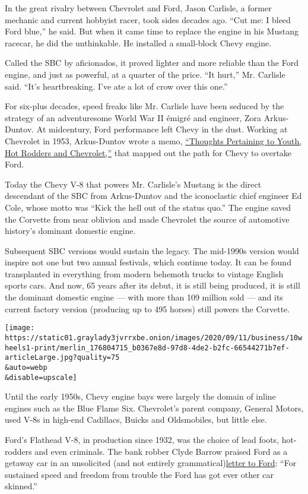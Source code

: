 In the great rivalry between Chevrolet and Ford, Jason Carlisle, a
former mechanic and current hobbyist racer, took sides decades ago.
``Cut me: I bleed Ford blue,'' he said. But when it came time to replace
the engine in his Mustang racecar, he did the unthinkable. He installed
a small-block Chevy engine.

Called the SBC by aficionados, it proved lighter and more reliable than
the Ford engine, and just as powerful, at a quarter of the price. ``It
hurt,'' Mr. Carlisle said. ``It's heartbreaking. I've ate a lot of crow
over this one.''

For six-plus decades, speed freaks like Mr. Carlisle have been seduced
by the strategy of an adventuresome World War II émigré and engineer,
Zora Arkus-Duntov. At midcentury, Ford performance left Chevy in the
dust. Working at Chevrolet in 1953, Arkus-Duntov wrote a memo,
\href{https://www.corvetteactioncenter.com/history/duntov_letter.html}{``Thoughts
Pertaining to Youth, Hot Rodders and Chevrolet,''} that mapped out the
path for Chevy to overtake Ford.

Today the Chevy V-8 that powers Mr. Carlisle's Mustang is the direct
descendant of the SBC from Arkus-Duntov and the iconoclastic chief
engineer Ed Cole, whose motto was ``Kick the hell out of the status
quo.'' The engine saved the Corvette from near oblivion and made
Chevrolet the source of automotive history's dominant domestic engine.

Subsequent SBC versions would sustain the legacy. The mid-1990s version
would inspire not one but two annual festivals, which continue today. It
can be found transplanted in everything from modern behemoth trucks to
vintage English sports cars. And now, 65 years after its debut, it is
still being produced, it is still the dominant domestic engine --- with
more than 109 million sold --- and its current factory version
(producing up to 495 horses) still powers the Corvette.

\texttt{[image: https://static01.graylady3jvrrxbe.onion/images/2020/09/11/business/10wheels1-print/merlin\_176804715\_b0367e8d-97d8-4de2-b2fc-66544271b7ef-articleLarge.jpg?quality=75\\\&auto=webp\\\&disable=upscale]}

Until the early 1950s, Chevy engine bays were largely the domain of
inline engines such as the Blue Flame Six. Chevrolet's parent company,
General Motors, used V-8s in high-end Cadillacs, Buicks and Oldsmobiles,
but little else.

Ford's Flathead V-8, in production since 1932, was the choice of lead
foots, hot-rodders and even criminals. The bank robber Clyde Barrow
praised Ford as a getaway car in an unsolicited (and not entirely
grammatical)\href{https://www.thehenryford.org/collections-and-research/digital-collections/artifact/281082/}{letter
to Ford}: ``For sustained speed and freedom from trouble the Ford has
got ever other car skinned.''

